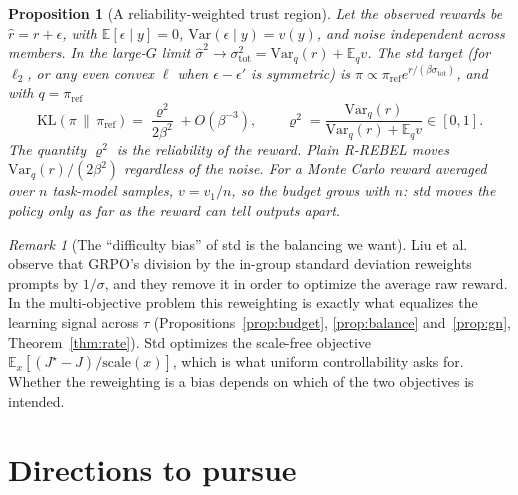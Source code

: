 \documentclass[11pt]{article}
\newtheorem{proposition}[theorem]{Proposition}
\theoremstyle{definition}
\theoremstyle{remark}
\newtheorem{remark}[theorem]{Remark}
\newcommand{\E}{\mathbb{E}}
\newcommand{\KL}{\mathrm{KL}}
\newcommand{\Var}{\mathrm{Var}}
\newcommand{\pref}{\pi_{\mathrm{ref}}}
\newcommand{\1}{\mathbb{1}}
\newcommand{\rr}{R-REBEL}
\begin{document}
\begin{proposition}[A reliability-weighted trust region]\label{prop:reliability}
Let the observed rewards be $\hat r=r+\epsilon$, with $\E[\epsilon\mid y]=0$,
$\Var(\epsilon\mid y)=v(y)$, and noise independent across members. In the large-$G$
limit $\hat\sigma^2\to\sigma_{\mathrm{tot}}^2=\Var_q(r)+\E_qv$. The std target (for
$\ell_2$, or any even convex $\ell$ when $\epsilon-\epsilon'$ is symmetric) is
$\pi\propto\pref e^{r/(\beta\sigma_{\mathrm{tot}})}$, and with $q=\pref$
\[
  \KL(\pi\,\|\,\pref)=\frac{\varrho^2}{2\beta^2}+O(\beta^{-3}),\qquad
  \varrho^2=\frac{\Var_q(r)}{\Var_q(r)+\E_qv}\in[0,1].
\]
The quantity $\varrho^2$ is the reliability of the reward. Plain \rr{} moves
$\Var_q(r)/(2\beta^2)$ regardless of the noise. For a Monte Carlo reward averaged
over $n$ task-model samples, $v=v_1/n$, so the budget grows with $n$: std moves the
policy only as far as the reward can tell outputs apart.
\end{proposition}

\begin{remark}[The ``difficulty bias'' of std is the balancing we want]\label{rem:drgrpo}
Liu et al.~\cite{drgrpo} observe that GRPO's division by the in-group standard
deviation reweights prompts by $1/\sigma$, and they remove it in order to optimize
the average raw reward. In the multi-objective problem this reweighting is exactly
what equalizes the learning signal across $\tau$ (Propositions~\ref{prop:budget},
\ref{prop:balance} and~\ref{prop:gn}, Theorem~\ref{thm:rate}). Std optimizes the
scale-free objective $\E_x[(J^\star-J)/\mathrm{scale}(x)]$, which is what uniform
controllability asks for. Whether the reweighting is a bias depends on which of the
two objectives is intended.
\end{remark}

\section{Directions to pursue}\label{sec:directions}
\end{document}
